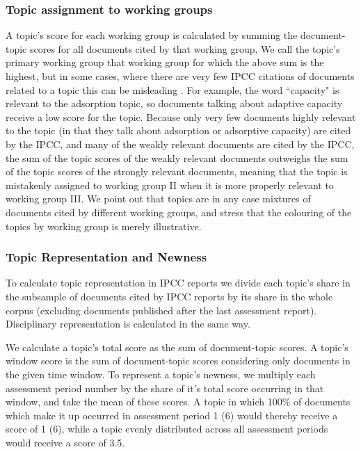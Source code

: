 \documentclass{article}
\begin{document}
\begin{linenumbers}
		\subsubsection*{Topic assignment to working groups}
		\label{topic-wg}
		A topic's score for each working group is calculated by summing the document-topic scores for all documents cited by that working group. We call the topic's primary working group that working group for which the above sum is the highest, but in some cases, where there are very few IPCC citations of documents related to a topic this can be misleading . For example, the word ``capacity" is relevant to the adsorption topic, so documents talking about adaptive capacity receive a low score for the topic. Because only very few documents highly relevant to the topic (in that they talk about adsorption or adsorptive capacity) are cited by the IPCC, and many of the weakly relevant documents are cited by the IPCC, the sum of the topic scores of the weakly relevant documents outweighs the sum of the topic scores of the strongly relevant documents, meaning that the topic is mistakenly assigned to working group II when it is more properly relevant to working group III. We point out that topics are in any case mixtures of documents cited by different working groups, and stress that the colouring of the topics by working group is merely illustrative.
		
		
		\subsubsection*{Topic Representation and Newness}
		
		To calculate topic representation in IPCC reports we divide each topic's share in the subsample of documents cited by IPCC reports by its share in the whole corpus (excluding documents published after the last assessment report). Disciplinary representation is calculated in the same way.
		
		We calculate a topic's total score as the sum of document-topic scores. A topic's window score is the sum of document-topic scores considering only documents in the given time window. To represent a topic's newness, we multiply each assessment period number by the share of it's total score occurring in that window, and take the mean of these scores. A topic in which 100\% of documents which make it up occurred in assessment period 1 (6) would thereby receive a score of 1 (6), while a topic evenly distributed across all assessment periods would receive a score of 3.5.
		

\end{linenumbers}
\end{document}
